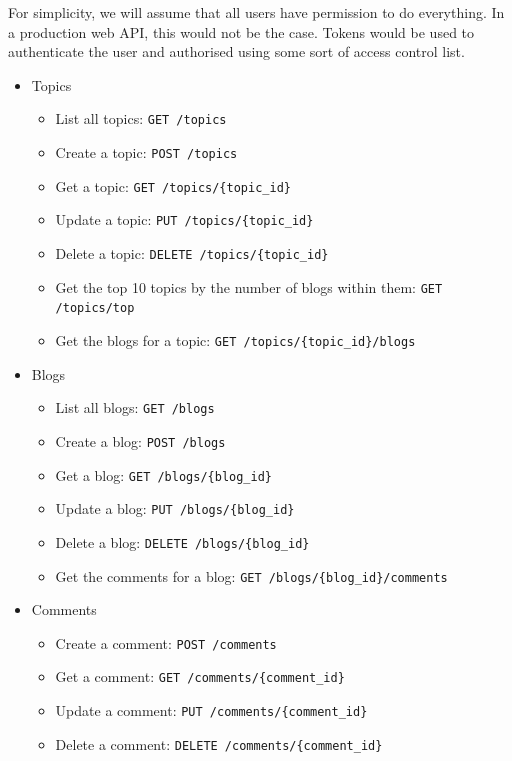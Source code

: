 \documentclass[]{full}
\theoremstyle{definition}
\begin{document}
For simplicity, we will assume that all users have permission to do everything. In a production web API, this would not be the case. Tokens would be used to authenticate the user and authorised using some sort of access control list.

\begin{itemize}
    \item Topics
    \begin{itemize}
        \item List all topics: \verb|GET /topics|
        \item Create a topic: \verb|POST /topics|
        \item Get a topic: \verb|GET /topics/{topic_id}|
        \item Update a topic: \verb|PUT /topics/{topic_id}|
        \item Delete a topic: \verb|DELETE /topics/{topic_id}|
        \item Get the top 10 topics by the number of blogs within them: \verb|GET /topics/top|
        \item Get the blogs for a topic: \verb|GET /topics/{topic_id}/blogs|
    \end{itemize}
    \item Blogs
    \begin{itemize}
        \item List all blogs: \verb|GET /blogs|
        \item Create a blog: \verb|POST /blogs|
        \item Get a blog: \verb|GET /blogs/{blog_id}|
        \item Update a blog: \verb|PUT /blogs/{blog_id}|
        \item Delete a blog: \verb|DELETE /blogs/{blog_id}|
        \item Get the comments for a blog: \verb|GET /blogs/{blog_id}/comments|
    \end{itemize}
    \item Comments
    \begin{itemize}
        \item Create a comment: \verb|POST /comments|
        \item Get a comment: \verb|GET /comments/{comment_id}|
        \item Update a comment: \verb|PUT /comments/{comment_id}|
        \item Delete a comment: \verb|DELETE /comments/{comment_id}|
    \end{itemize}
\end{itemize}
\end{document}
